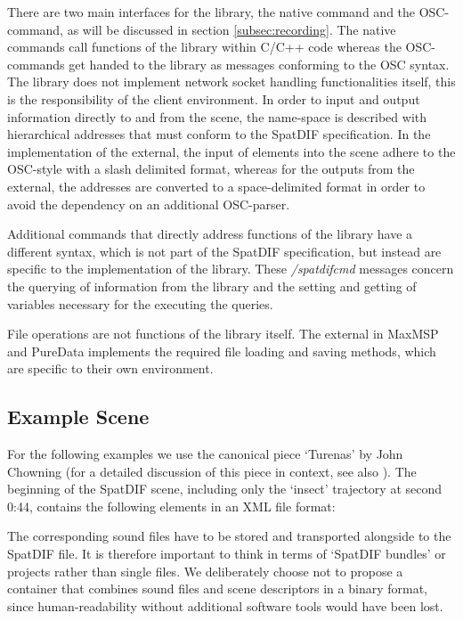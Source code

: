 \documentclass{article}
\begin{document}
There are two main interfaces for the library, the native command and the OSC-command, as will be discussed in section \ref{subsec:recording}.
The native commands call functions of the library within C/C++ code whereas the OSC-commands get handed to the library as messages conforming to the OSC syntax.
The library does not implement network socket handling functionalities itself, this is the responsibility of the client environment.
In order to input and output information directly to and from the scene, the name-space is described with hierarchical addresses that must conform to the SpatDIF specification.
In the implementation of the external, the input of elements into the scene adhere to the OSC-style with a slash delimited format, whereas for the outputs from the external, the addresses are converted to a space-delimited format in order to avoid the dependency on an additional OSC-parser.

Additional commands that directly address functions of the library have a different syntax, which is not part of the SpatDIF specification, but instead are specific to the implementation of the library.
These \emph{/spatdifcmd} messages concern the querying of information from the library and the setting and getting of variables necessary for the executing the queries.

File operations are not functions of the library itself.
The external in MaxMSP and PureData implements the required file loading and saving methods, which are specific to their own environment. 
  
\subsection{Example Scene}\label{sec:examples}

For the following examples we use the canonical piece `Turenas' by John Chowning \cite{chowningturenas} (for a detailed discussion of this piece in context, see also \cite{Peters:2013SpatDifCMJ}). 
The beginning of the SpatDIF scene, including only the `insect' trajectory at second 0:44, contains the following elements in an XML file format:

 

The corresponding sound files have to be stored and transported alongside to the SpatDIF file.
It is therefore important to think in terms of ‘SpatDIF bundles’ or projects rather than single files. 
We deliberately choose not to propose a container that combines sound files and scene descriptors in a binary format, since human-readability without additional software tools would have been lost. 
 
\end{document}
